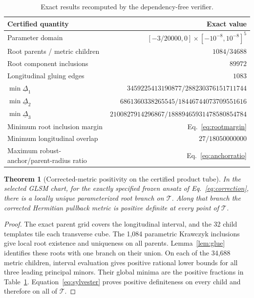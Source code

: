 \documentclass[11pt]{article}
\newtheorem{theorem}{Theorem}
\newcommand{\TT}{\mathcal{T}}
\begin{document}
\begin{table}[ht]
\centering
\small
\begin{tabular}{lr}
\toprule
Certified quantity & Exact value\\
\midrule
Parameter domain & $[-3/20000,0]\times[-10^{-8},10^{-8}]^5$\\
Root parents / metric children & $1084 / 34688$\\
Root component inclusions & $89972$\\
Longitudinal gluing edges & $1083$\\
$\min\underline{\Delta}_1$ & $3459225413190877/288230376151711744$\\
$\min\underline{\Delta}_2$ & $6861360338265545/18446744073709551616$\\
$\min\underline{\Delta}_3$ & $2100827914296867/18889465931478580854784$\\
Minimum root inclusion margin & Eq.~\eqref{eq:rootmargin}\\
Minimum longitudinal overlap & $27/18050000000$\\
Maximum robust-anchor/parent-radius ratio & Eq.~\eqref{eq:anchorratio}\\
\bottomrule
\end{tabular}
\caption{Exact results recomputed by the dependency-free verifier.}
\label{tab:main}
\end{table}

\begin{theorem}[Corrected-metric positivity on the certified product tube]
\label{thm:main}
In the selected GLSM chart, for the exactly specified frozen ansatz of
Eq.~\eqref{eq:correction}, there is a locally unique parameterized root branch
on $\TT$.  Along that branch the corrected Hermitian pullback metric is
positive definite at every point of $\TT$.
\end{theorem}

\begin{proof}
The exact parent grid covers the longitudinal interval, and the 32 child
templates tile each transverse cube.  The 1,084 parametric Krawczyk inclusions
give local root existence and uniqueness on all parents.  Lemma~\ref{lem:glue}
identifies these roots with one branch on their union.  On each of the 34,688
metric children, interval evaluation gives positive rational lower bounds for
all three leading principal minors.  Their global minima are the positive
fractions in Table~\ref{tab:main}.  Equation~\eqref{eq:sylvester} proves
positive definiteness on every child and therefore on all of $\TT$.
\end{proof}
\end{document}
